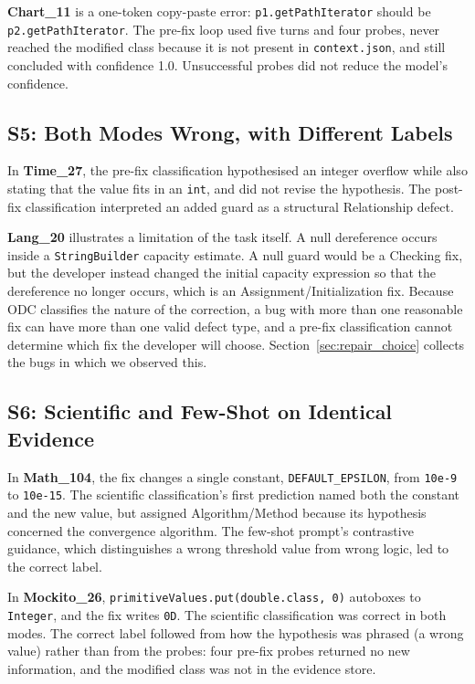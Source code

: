\documentclass{iutbscthesis}
\begin{document}
\textbf{Chart\_11} is a one-token copy-paste error: \texttt{p1.\allowbreak get\allowbreak Path\allowbreak Iterator} should be \texttt{p2.\allowbreak get\allowbreak Path\allowbreak Iterator}. The pre-fix loop used five turns and four probes, never reached the modified class because it is not present in \texttt{context.json}, and still concluded with confidence 1.0. Unsuccessful probes did not reduce the model's confidence.

\subsection{S5: Both Modes Wrong, with Different Labels}

In \textbf{Time\_27}, the pre-fix classification hypothesised an integer overflow while also stating that the value fits in an \texttt{int}, and did not revise the hypothesis. The post-fix classification interpreted an added guard as a structural Relationship defect.

\textbf{Lang\_20} illustrates a limitation of the task itself. A null dereference occurs inside a \texttt{String\allowbreak Builder} capacity estimate. A null guard would be a Checking fix, but the developer instead changed the initial capacity expression so that the dereference no longer occurs, which is an Assignment/\allowbreak Initialization fix. Because ODC classifies the nature of the correction, a bug with more than one reasonable fix can have more than one valid defect type, and a pre-fix classification cannot determine which fix the developer will choose. Section~\ref{sec:repair_choice} collects the bugs in which we observed this.

\subsection{S6: Scientific and Few-Shot on Identical Evidence}

In \textbf{Math\_104}, the fix changes a single constant, \texttt{DEFAULT\_\allowbreak EPSILON}, from \texttt{10e-9} to \texttt{10e-15}. The scientific classification's first prediction named both the constant and the new value, but assigned Algorithm/Method because its hypothesis concerned the convergence algorithm. The few-shot prompt's contrastive guidance, which distinguishes a wrong threshold value from wrong logic, led to the correct label.

In \textbf{Mockito\_26}, \texttt{primitive\allowbreak Values.\allowbreak put(double.\allowbreak class, 0)} autoboxes to \texttt{Integer}, and the fix writes \texttt{0D}. The scientific classification was correct in both modes. The correct label followed from how the hypothesis was phrased (a wrong value) rather than from the probes: four pre-fix probes returned no new information, and the modified class was not in the evidence store.
\end{document}

